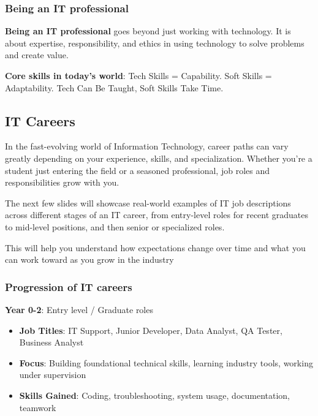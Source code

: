 \subsubsection{Being an IT professional}

\noindent \textbf{Being an IT professional} goes beyond just working with technology. It is about expertise, responsibility, and ethics in using technology to solve problems and create value.

\noindent\textbf{Core skills in today's world}: Tech Skills = Capability. Soft Skills = Adaptability. Tech Can Be Taught, Soft Skills Take Time.

\subsection{IT Careers}

\indent 

In the fast-evolving world of Information Technology, career paths can vary greatly depending on your experience, skills, and specialization. Whether you're a student just entering the field or a seasoned professional, job roles and responsibilities grow with you.

The next few slides will showcase real-world examples of IT job descriptions across different stages of an IT career, from entry-level roles for recent graduates to mid-level positions, and then senior or specialized roles.

This will help you understand how expectations change over time and what you can work toward as you grow in the industry

\subsubsection{Progression of IT careers}

\noindent\textbf{Year 0-2}: Entry level / Graduate roles

\begin{itemize}
    \item \textbf{Job Titles}: IT Support, Junior Developer, Data Analyst, QA Tester, Business Analyst
    \item \textbf{Focus}: Building foundational technical skills, learning industry tools, working under supervision
    \item \textbf{Skills Gained}: Coding, troubleshooting, system usage, documentation, teamwork
\end{itemize}

\bigskip

